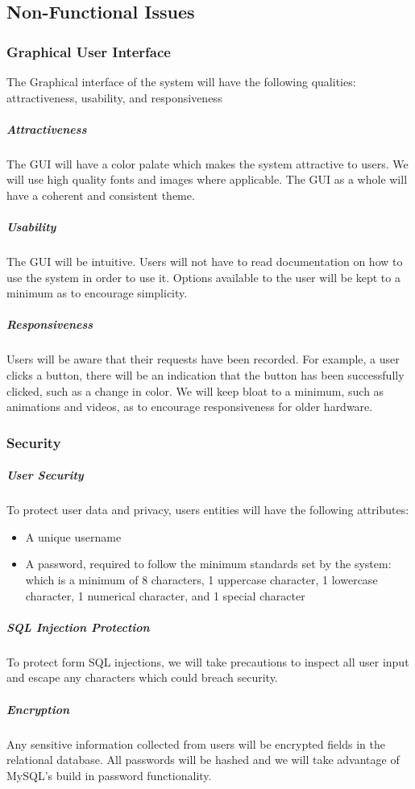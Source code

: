 \documentclass[letter, 12pt, titlepage]{article}
\begin{document}
		
\subsection{Non-Functional Issues}

		\subsubsection{Graphical User Interface}
			The Graphical interface of the system will have the following qualities: attractiveness, usability, and responsiveness
			\subparagraph{Attractiveness}
				The GUI will have a color palate which makes the system attractive to users. We will use high quality fonts and images where applicable. The GUI as a whole will have a coherent and consistent theme. 
			\subparagraph{Usability}
				The GUI will be intuitive. Users will not have to read documentation on how to use the system in order to use it. Options available to the user will be kept to a minimum as to encourage simplicity.
			\subparagraph{Responsiveness}
				Users will be aware that their requests have been recorded. For example, a user clicks a button, there will be an indication that the button has been successfully clicked, such as a change in color. We will keep bloat to a minimum, such as animations and videos, as to encourage responsiveness for older hardware.

		\subsubsection{Security}
			\subparagraph{User Security}
				To protect user data and privacy, users entities will have the following attributes:
				\begin{itemize}
						\item A unique username
						\item A password, required to follow the minimum standards set by the system: which is a minimum of 8 characters, 1 uppercase character, 1 lowercase character, 1 numerical character, and 1 special character
				\end{itemize}

			\subparagraph{SQL Injection Protection}
				To protect form SQL injections, we will take precautions to inspect all user input and escape any characters which could breach security.

			\subparagraph{Encryption}
				Any sensitive information collected from users will be encrypted fields in the relational database. All passwords will be hashed and we will take advantage of MySQL's build in password functionality.
\end{document}
